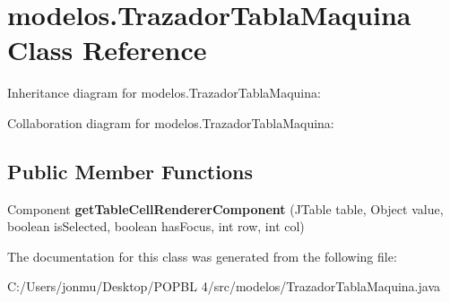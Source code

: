 \hypertarget{classmodelos_1_1_trazador_tabla_maquina}{}\section{modelos.\+Trazador\+Tabla\+Maquina Class Reference}
\label{classmodelos_1_1_trazador_tabla_maquina}


Inheritance diagram for modelos.\+Trazador\+Tabla\+Maquina\+:


Collaboration diagram for modelos.\+Trazador\+Tabla\+Maquina\+:
\subsection*{Public Member Functions}
\begin{DoxyCompactItemize}
\item 
\mbox{\label{classmodelos_1_1_trazador_tabla_maquina_a2ea391f01832f424c6e212bd8ff86484}} 
Component {\bfseries get\+Table\+Cell\+Renderer\+Component} (J\+Table table, Object value, boolean is\+Selected, boolean has\+Focus, int row, int col)
\end{DoxyCompactItemize}


The documentation for this class was generated from the following file\+:\begin{DoxyCompactItemize}
\item 
C\+:/\+Users/jonmu/\+Desktop/\+P\+O\+P\+B\+L 4/src/modelos/Trazador\+Tabla\+Maquina.\+java\end{DoxyCompactItemize}
